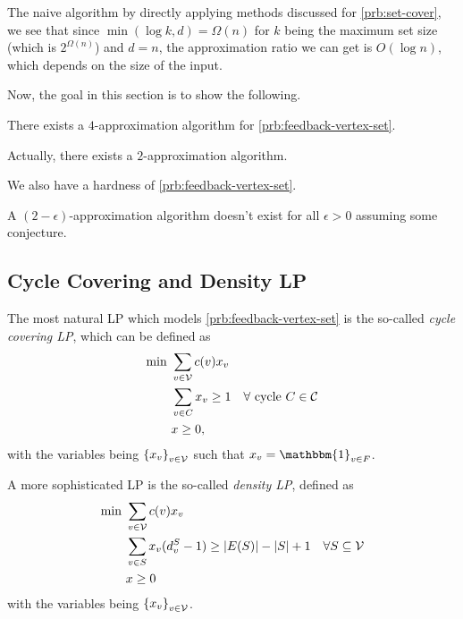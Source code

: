 \begin{note}
	The naive algorithm by directly applying methods discussed for \autoref{prb:set-cover}, we see that since \(\min (\log k, d) = \Omega (n)\) for \(k\) being the maximum set size (which is \(2^{\Omega (n)}\)) and \(d = n\), the approximation ratio we can get is \(O(\log n)\), which depends on the size of the input.
\end{note}

Now, the goal in this section is to show the following.
\begin{theorem}\label{thm:lec4-1}
	There exists a \(4\)-approximation algorithm for \autoref{prb:feedback-vertex-set}.
\end{theorem}

\begin{remark}
	Actually, there exists a \(2\)-approximation algorithm.
\end{remark}

We also have a hardness of \autoref{prb:feedback-vertex-set}.
\begin{theorem}
	A \((2 - \epsilon )\)-approximation algorithm doesn't exist for all \(\epsilon > 0\) assuming some conjecture.
\end{theorem}

\subsection{Cycle Covering and Density LP}
The most natural LP which models \autoref{prb:feedback-vertex-set} is the so-called \emph{cycle covering LP}, which can be defined as
\begin{align*}
	\min~ & \sum_{v\in \mathcal{\MakeUppercase{V}} } c(v) x_v                                                               \\
	      & \sum_{v\in C} x_v \geq 1                         \quad \forall \text{ cycle } C \in \mathcal{\MakeUppercase{C}} \\
	      & x \geq 0,
\end{align*}
with the variables being \(\left\{ x_v \right\} _{v\in \mathcal{\MakeUppercase{v}} }\) such that \(x_{v} = \mathbbm{1}_{v\in F}\).

A more sophisticated LP is the so-called \emph{density LP}, defined as
\begin{align*}
	\min~ & \sum_{v\in \mathcal{\MakeUppercase{v}} } c(v) x_v                                                                                                  \\
	      & \sum_{v\in S} x_v(d_v^{S} - 1) \geq \left\vert E(S) \right\vert - \left\vert S \right\vert + 1\quad \forall S\subseteq \mathcal{\MakeUppercase{v}} \\
	      & x\geq 0
\end{align*}
with the variables being \(\left\{ x_v \right\} _{v\in \mathcal{\MakeUppercase{v}} }\).

